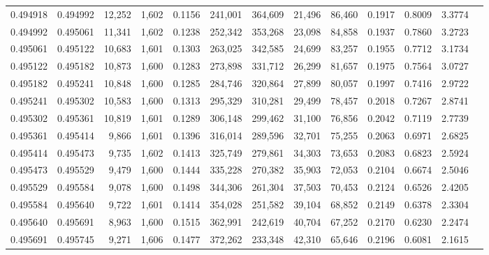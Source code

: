 \begin{tabular}{rrrrrrrrrrrrr}
0.494918 & 0.494992 & 12,252 & 1,602 &                                     0.1156 & 241,001 & 364,609 &  21,496 &  86,460 & 0.1917 & 0.8009 & 3.3774 \\
0.494992 & 0.495061 & 11,341 & 1,602 &                                     0.1238 & 252,342 & 353,268 &  23,098 &  84,858 & 0.1937 & 0.7860 & 3.2723 \\
0.495061 & 0.495122 & 10,683 & 1,601 &                                     0.1303 & 263,025 & 342,585 &  24,699 &  83,257 & 0.1955 & 0.7712 & 3.1734 \\
0.495122 & 0.495182 & 10,873 & 1,600 &                                     0.1283 & 273,898 & 331,712 &  26,299 &  81,657 & 0.1975 & 0.7564 & 3.0727 \\
0.495182 & 0.495241 & 10,848 & 1,600 &                                     0.1285 & 284,746 & 320,864 &  27,899 &  80,057 & 0.1997 & 0.7416 & 2.9722 \\
0.495241 & 0.495302 & 10,583 & 1,600 &                                     0.1313 & 295,329 & 310,281 &  29,499 &  78,457 & 0.2018 & 0.7267 & 2.8741 \\
0.495302 & 0.495361 & 10,819 & 1,601 &                                     0.1289 & 306,148 & 299,462 &  31,100 &  76,856 & 0.2042 & 0.7119 & 2.7739 \\
0.495361 & 0.495414 &  9,866 & 1,601 &                                     0.1396 & 316,014 & 289,596 &  32,701 &  75,255 & 0.2063 & 0.6971 & 2.6825 \\
0.495414 & 0.495473 &  9,735 & 1,602 &                                     0.1413 & 325,749 & 279,861 &  34,303 &  73,653 & 0.2083 & 0.6823 & 2.5924 \\
0.495473 & 0.495529 &  9,479 & 1,600 &                                     0.1444 & 335,228 & 270,382 &  35,903 &  72,053 & 0.2104 & 0.6674 & 2.5046 \\
0.495529 & 0.495584 &  9,078 & 1,600 &                                     0.1498 & 344,306 & 261,304 &  37,503 &  70,453 & 0.2124 & 0.6526 & 2.4205 \\
0.495584 & 0.495640 &  9,722 & 1,601 &                                     0.1414 & 354,028 & 251,582 &  39,104 &  68,852 & 0.2149 & 0.6378 & 2.3304 \\
0.495640 & 0.495691 &  8,963 & 1,600 &                                     0.1515 & 362,991 & 242,619 &  40,704 &  67,252 & 0.2170 & 0.6230 & 2.2474 \\
0.495691 & 0.495745 &  9,271 & 1,606 &                                     0.1477 & 372,262 & 233,348 &  42,310 &  65,646 & 0.2196 & 0.6081 & 2.1615 \\

\end{tabular}
